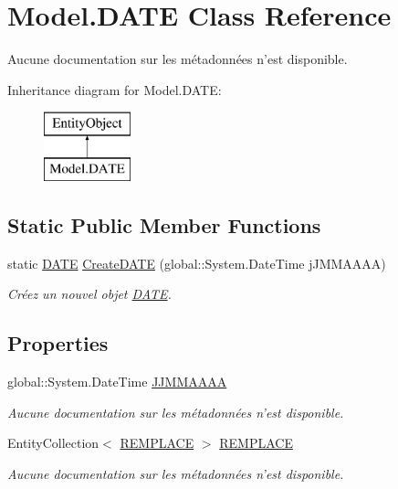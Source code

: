 \hypertarget{class_model_1_1_d_a_t_e}{\section{Model.\-D\-A\-T\-E Class Reference}
\label{class_model_1_1_d_a_t_e}
}


Aucune documentation sur les métadonnées n'est disponible.  


Inheritance diagram for Model.\-D\-A\-T\-E\-:\begin{figure}[H]
\begin{center}
\leavevmode
\includegraphics[height=2.000000cm]{class_model_1_1_d_a_t_e}
\end{center}
\end{figure}
\subsection*{Static Public Member Functions}
\begin{DoxyCompactItemize}
\item 
static \hyperlink{class_model_1_1_d_a_t_e}{D\-A\-T\-E} \hyperlink{class_model_1_1_d_a_t_e_ae765dee9b8e798c923cf5e7ae684be6c}{Create\-D\-A\-T\-E} (global\-::\-System.\-Date\-Time j\-J\-M\-M\-A\-A\-A\-A)
\begin{DoxyCompactList}\small\item\em Créez un nouvel objet \hyperlink{class_model_1_1_d_a_t_e}{D\-A\-T\-E}. \end{DoxyCompactList}\end{DoxyCompactItemize}
\subsection*{Properties}
\begin{DoxyCompactItemize}
\item 
global\-::\-System.\-Date\-Time \hyperlink{class_model_1_1_d_a_t_e_a235454d739b3af26e48977c29d385907}{J\-J\-M\-M\-A\-A\-A\-A}
\begin{DoxyCompactList}\small\item\em Aucune documentation sur les métadonnées n'est disponible. \end{DoxyCompactList}\item 
Entity\-Collection$<$ \hyperlink{class_model_1_1_r_e_m_p_l_a_c_e}{R\-E\-M\-P\-L\-A\-C\-E} $>$ \hyperlink{class_model_1_1_d_a_t_e_ab660780ffb5bef16c7c3632f69eaa926}{R\-E\-M\-P\-L\-A\-C\-E}
\begin{DoxyCompactList}\small\item\em Aucune documentation sur les métadonnées n'est disponible. \end{DoxyCompactList}\end{DoxyCompactItemize}


